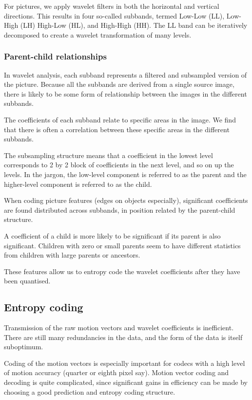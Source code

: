 For pictures, we apply wavelet filters in both the horizontal and
vertical directions. This results in four so-called subbands, termed
Low-Low (LL), Low-High (LH) High-Low (HL), and High-High (HH). The LL
band can be iteratively decomposed to create a wavelet transformation of
many levels.


\subsubsection{Parent-child relationships}
In wavelet analysis, each subband represents a filtered and subsampled
version of the picture. Because all the subbands are derived from a
single source image, there is likely to be some form of relationship
between the images in the different subbands.

The coefficients of each subband relate to specific areas in the image.
We find that there is often a correlation between these specific areas
in the different subbands.

The subsampling structure means that a coefficient in the lowest level
corresponds to  2 by 2 block of coefficients in the next level, and so
on up the levels. In the jargon, the low-level component is referred to
as the parent and the higher-level component is referred to as the
child.

When coding picture features (edges on objects especially), significant
coefficients are found distributed across subbands, in position related
by the parent-child structure.

A coefficient of a child is more likely to be significant if its parent
is also significant. Children with zero or small parents seem to have
different statistics from children with large parents or ancestors.

These features allow us to entropy code the wavelet coefficients after
they have been quantised.

\subsection{Entropy coding}

Transmission of the raw motion vectors and wavelet coefficients is
inefficient. There are still many redundancies in the data, and the form
of the data is itself suboptimum.

Coding of the motion vectors is especially important for codecs with a
high level of motion accuracy (quarter or eighth pixel say). Motion
vector coding and decoding is quite complicated, since significant gains
in efficiency can be made by choosing a good prediction and entropy
coding structure.

